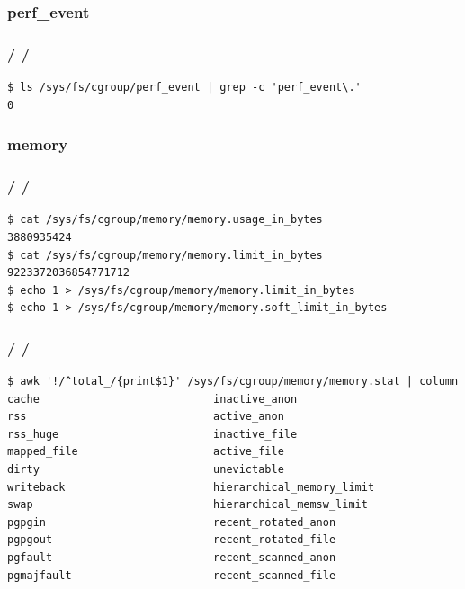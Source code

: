 \documentclass{beamer}
\newcommand{\autotitle}
{\frametitle{
    \secname
    \ifx\insertsubsection\empty
    \else
        /\subsecname
        \ifx\insertsubsubsection\empty\else/\subsubsecname\fi
    \fi}}
\begin{document}
\subsubsection{perf\_event}

\begin{frame}[fragile]
    \autotitle
    \begin{verbatim}
$ ls /sys/fs/cgroup/perf_event | grep -c 'perf_event\.'
0
    \end{verbatim}
\end{frame}

\subsubsection{memory}

\begin{frame}[fragile]
    \autotitle
    \begin{verbatim}
$ cat /sys/fs/cgroup/memory/memory.usage_in_bytes
3880935424
$ cat /sys/fs/cgroup/memory/memory.limit_in_bytes
9223372036854771712
$ echo 1 > /sys/fs/cgroup/memory/memory.limit_in_bytes
$ echo 1 > /sys/fs/cgroup/memory/memory.soft_limit_in_bytes
    \end{verbatim}
\end{frame}

\begin{frame}[fragile]
    \autotitle
    \begin{verbatim}
$ awk '!/^total_/{print$1}' /sys/fs/cgroup/memory/memory.stat | column
cache                           inactive_anon
rss                             active_anon
rss_huge                        inactive_file
mapped_file                     active_file
dirty                           unevictable
writeback                       hierarchical_memory_limit
swap                            hierarchical_memsw_limit
pgpgin                          recent_rotated_anon
pgpgout                         recent_rotated_file
pgfault                         recent_scanned_anon
pgmajfault                      recent_scanned_file
    \end{verbatim}
\end{frame}
\end{document}
